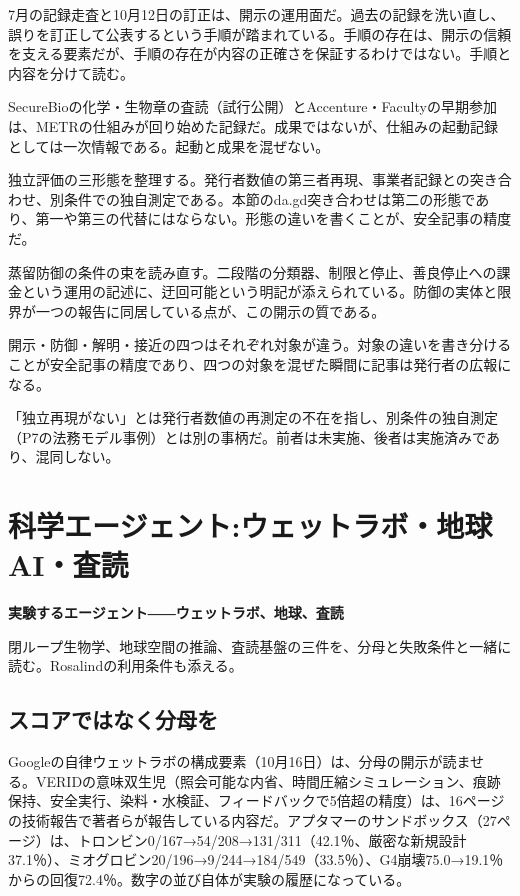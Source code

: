 \documentclass[lualatex,a4paper,10pt]{jlreq}
\begin{document}
7月の記録走査と10月12日の訂正は、開示の運用面だ。過去の記録を洗い直し、誤りを訂正して公表するという手順が踏まれている。手順の存在は、開示の信頼を支える要素だが、手順の存在が内容の正確さを保証するわけではない。手順と内容を分けて読む。
\cite{B40}


SecureBioの化学・生物章の査読（試行公開）とAccenture・Facultyの早期参加は、METRの仕組みが回り始めた記録だ。成果ではないが、仕組みの起動記録としては一次情報である。起動と成果を混ぜない。
\cite{B39}


独立評価の三形態を整理する。発行者数値の第三者再現、事業者記録との突き合わせ、別条件での独自測定である。本節のda.gd突き合わせは第二の形態であり、第一や第三の代替にはならない。形態の違いを書くことが、安全記事の精度だ。
\cite{B40}


蒸留防御の条件の束を読み直す。二段階の分類器、制限と停止、善良停止への課金という運用の記述に、迂回可能という明記が添えられている。防御の実体と限界が一つの報告に同居している点が、この開示の質である。
\cite{B41}


開示・防御・解明・接近の四つはそれぞれ対象が違う。対象の違いを書き分けることが安全記事の精度であり、四つの対象を混ぜた瞬間に記事は発行者の広報になる。
\cite{B39,B40,B41,B42}


「独立再現がない」とは発行者数値の再測定の不在を指し、別条件の独自測定（P7の法務モデル事例）とは別の事柄だ。前者は未実施、後者は実施済みであり、混同しない。

\section{科学エージェント:ウェットラボ・地球AI・査読}
\label{sec:P6}

{\Large\bfseries 実験するエージェント――ウェットラボ、地球、査読\par}
\smallskip
{\color{SurveyMuted}閉ループ生物学、地球空間の推論、査読基盤の三件を、分母と失敗条件と一緒に読む。Rosalindの利用条件も添える。\par}
\bigskip

\subsection*{スコアではなく分母を}

Googleの自律ウェットラボの構成要素（10月16日）は、分母の開示が読ませる。VERIDの意味双生児（照会可能な内省、時間圧縮シミュレーション、痕跡保持、安全実行、染料・水検証、フィードバックで5倍超の精度）は、16ページの技術報告で著者らが報告している内容だ。アプタマーのサンドボックス（27ページ）は、トロンビン0/167→54/208→131/311（42.1％、厳密な新規設計37.1％）、ミオグロビン20/196→9/244→184/549（33.5％）、G4崩壊75.0→19.1％からの回復72.4％。数字の並び自体が実験の履歴になっている。
\cite{B43,B44,B45,B46}
\end{document}
